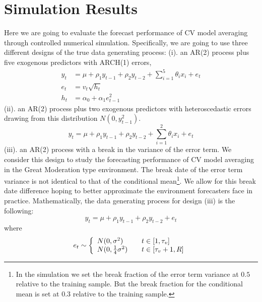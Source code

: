 \section{Simulation Results}
Here we are going to evaluate the forecast performance of CV model averaging through controlled numerical simulation. Specifically, we are going to use three different designs of the true data generating process: (i). an AR(2) process plus five exogenous predictors with ARCH(1) errors,
\begin{subequations}
            \begin{align}
                y_{t} & = \mu + \rho_{1}y_{t-1} + \rho_{2}y_{t-2} + \sum_{i=1}^{5}\theta_{i}x_{i} + e_{t} \\
                e_{t} & = v_{t}\sqrt{h_{t}}\\
                h_{t} & = \alpha_{0} + \alpha_{1}e_{t-1}^2
            \end{align}
\end{subequations}
(ii). an AR(2) process plus two exogenous predictors with heteroscedastic errors drawing from this distribution $N(0,y_{t-1}^2)$.
\begin{equation}
                y_{t} = \mu + \rho_{1}y_{t-1} + \rho_{2}y_{t-2} + \sum_{i=1}^{2}\theta_{i}x_{i} + e_{t}
\end{equation}
(iii). an AR(2) process with a break in the variance of the error term. We consider this design to study the forecasting performance of CV model averaging in the Great Moderation type environment. The break date of the error term variance is not identical to that of the conditional mean\footnote{In the simulation we set the break fraction of the error term variance at $0.5$ relative to the training sample. But the break fraction for the conditional mean is set at $0.3$ relative to the training sample.}. We allow for this break date difference hoping to better approximate the environment forecasters face in practice. Mathematically, the data generating process for design (iii) is the following:
\begin{equation}
            y_{t} = \mu + \rho_{1}y_{t-1} + \rho_{2}y_{t-2} + e_{t}
\end{equation}
where
\[ e_{t} \sim \left\{
  \begin{array}{l l}
    N(0,\sigma^2) & \quad t \in [1,\tau_{v}]\\
    N(0,\frac{1}{4}\sigma^2) & \quad t \in [\tau_{v}+1, R]
\end{array} \right.\]
